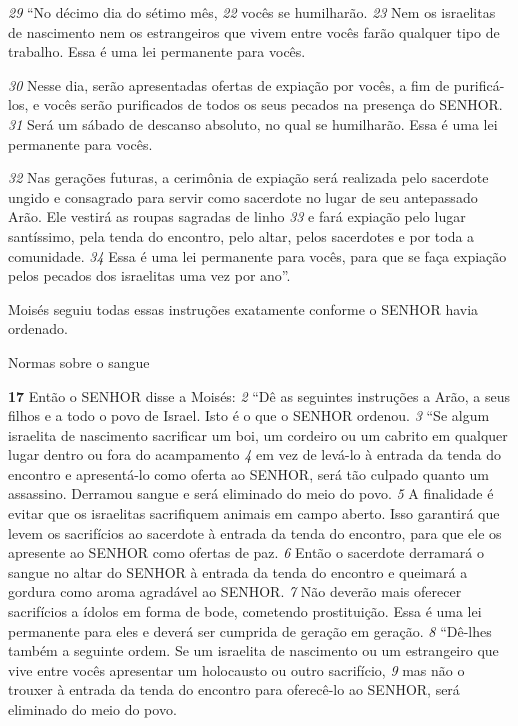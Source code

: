 \smallskip   
\textit{\tiny 29}
“No décimo dia do sétimo mês,
\textit{\tiny 22}
 vocês se humilharão.
\textit{\tiny 23}
 Nem os israelitas de
nascimento nem os estrangeiros que vivem entre vocês farão qualquer tipo de
trabalho. Essa é uma lei permanente para vocês. 

\smallskip   
\textit{\tiny 30}
Nesse dia, serão apresentadas
ofertas de expiação por vocês, a fim de purificá-los, e vocês serão purificados de
todos os seus pecados na presença do SENHOR. 
\textit{\tiny 31}
Será um sábado de descanso
absoluto, no qual se humilharão. Essa é uma lei permanente para vocês. 

\smallskip   
\textit{\tiny 32}
Nas
gerações futuras, a cerimônia de expiação será realizada pelo sacerdote ungido e
consagrado para servir como sacerdote no lugar de seu antepassado Arão. Ele
vestirá as roupas sagradas de linho 
\textit{\tiny 33}
e fará expiação pelo lugar santíssimo, pela
tenda do encontro, pelo altar, pelos sacerdotes e por toda a comunidade. 
\textit{\tiny 34}
Essa é
uma lei permanente para vocês, para que se faça expiação pelos pecados dos
israelitas uma vez por ano”.

\smallskip   
   Moisés seguiu todas essas instruções exatamente conforme o SENHOR havia
ordenado.

\bigskip   
Normas sobre o sangue

\textbf{\large 17}
 Então o SENHOR disse a Moisés: 
\textit{\tiny 2} 
“Dê as seguintes instruções a Arão, a seus
filhos e a todo o povo de Israel. Isto é o que o SENHOR ordenou. 
\textit{\tiny 3} 
“Se algum israelita de nascimento sacrificar um boi,
 um cordeiro ou um
cabrito em qualquer lugar dentro ou fora do acampamento 
\textit{\tiny 4} 
em vez de levá-lo à
entrada da tenda do encontro e apresentá-lo como oferta ao SENHOR, será tão
culpado quanto um assassino.
 Derramou sangue e será eliminado do meio do
povo. 
\textit{\tiny 5} 
A finalidade é evitar que os israelitas sacrifiquem animais em campo
aberto. Isso garantirá que levem os sacrifícios ao sacerdote à entrada da tenda do
encontro, para que ele os apresente ao SENHOR como ofertas de paz. 
\textit{\tiny 6} 
Então o
sacerdote derramará o sangue no altar do SENHOR à entrada da tenda do encontro
e queimará a gordura como aroma agradável ao SENHOR. 
\textit{\tiny 7} 
Não deverão mais
oferecer sacrifícios a ídolos em forma de bode,
 cometendo prostituição. Essa é
uma lei permanente para eles e deverá ser cumprida de geração em geração. 
\textit{\tiny 8} 
“Dê-lhes também a seguinte ordem. Se um israelita de nascimento ou um
estrangeiro que vive entre vocês apresentar um holocausto ou outro sacrifício, 
\textit{\tiny 9} 
mas não o trouxer à entrada da tenda do encontro para oferecê-lo ao SENHOR,
será eliminado do meio do povo.
   
